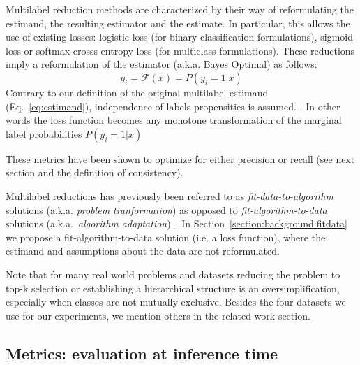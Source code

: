 Multilabel reduction methods are characterized by their way of reformulating the estimand, the resulting estimator and the estimate. In particular, this allows the use of existing losses: logistic loss (for binary classification formulations), sigmoid loss or softmax crosss-entropy loss (for multiclass formulations). These reductions imply a reformulation of the estimator (a.k.a. Bayes Optimal) as follows:
%
\begin{equation}
  y_i = \mathcal{F}(x) = P(y_i = 1 | x)
\end{equation}
%
Contrary to our definition of the original multilabel estimand (Eq.~\ref{eq:estimand}), independence of labels propensities is assumed. . In other words the loss function becomes any monotone transformation of the marginal label probabilities $ P(y_i = 1 | x)$ ~\cite{OVA2, multilabelMetrics, unifiedView}

These  metrics have been shown to optimize for either precision or recall (see next section and the definition of consistency).

Multilabel reductions has previously been referred to as \emph{fit-data-to-algorithm} solutions (a.k.a. \emph{problem tranformation}) as opposed to \emph{fit-algorithm-to-data} solutions (a.k.a.\ \emph{algorithm adaptation})~\cite{multilabelReview, multilabelReview2}. In Section~\ref{section:background:fitdata} we propose a fit-algorithm-to-data solution (i.e. a loss function), where the estimand and assumptions about the data are not reformulated.

Note that for many real world problems and datasets reducing the problem to top-k selection or establishing a hierarchical structure is an oversimplification, especially when classes are not mutually exclusive. Besides the four datasets we use for our experiments, we mention others in the related work section.

\subsection{Metrics: evaluation at inference time}
\label{section:background:metrics}

